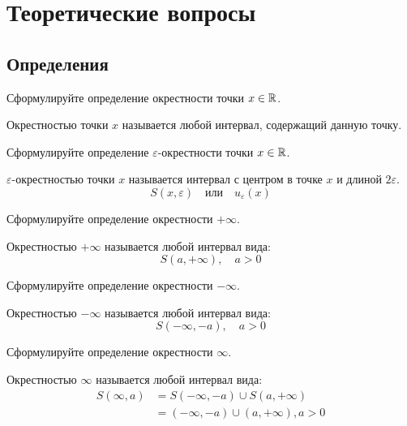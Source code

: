 
\section{Теоретические вопросы}

\subsection{Определения}

\begin{question}
  Сформулируйте определение окрестности точки $x \in \mathbb{R}$. 
\end{question}
\begin{answer}
  Окрестностью точки $x$ называется любой интервал, содержащий данную точку.
\end{answer}

\begin{question}
  Сформулируйте определение $\varepsilon$-окрестности точки $x \in \mathbb{R}$.
\end{question}
\begin{answer}
  $\varepsilon$-окрестностью точки $x$ называется интервал с центром в точке $x$ и длиной $2\varepsilon$. \[
    S(x, \varepsilon) \quad \text{или} \quad u_{\varepsilon}(x)
  \] 
\end{answer}

\begin{question}
   Сформулируйте определение окрестности $+\infty$.
\end{question}
\begin{answer}
  Окрестностью $+\infty$ называется любой интервал вида: \[
  S(a, +\infty), \quad a > 0
  \] 
\end{answer}

\begin{question}
   Сформулируйте определение окрестности $-\infty$.
\end{question}
\begin{answer}
  Окрестностью $-\infty$ называется любой интервал вида: \[
  S(-\infty, -a), \quad a > 0
  \] 
\end{answer}

\begin{question}
   Сформулируйте определение окрестности $\infty$.
\end{question}
\begin{answer}
  Окрестностью $\infty$ называется любой интервал вида:
  \begin{align*}
    S(\infty, a) &= S(-\infty, -a) \cup S(a, +\infty) \\
            &= (-\infty, -a) \cup (a, +\infty), a > 0
  \end{align*}
\end{answer}

